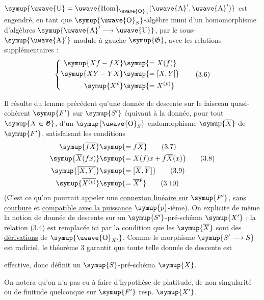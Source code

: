  $\symup{\text{\uwave{U}}=
\mathop{\text{\uwave{Hom}}}\nolimits_{\text{\uwave{O}}_S}(\text{\uwave{A}}',\text{\uwave{A}}')}$ est engendré, en
tant que $\symup{\text{\uwave{O}}_S}$-algèbre muni d'un homomorphisme d'algèbres
$\symup{\text{\uwave{A}}'\longrightarrow\text{\uwave{U}}}$, par le sous-$\symup{\text{\uwave{A}}'}$-module à
gauche $\symup{\mathfrak G}$, avec les relations supplémentaires :
\begin{equation}
  \left\{
  \begin{aligned}\symup{Xf-fX}&\symup{=X(f)}\\\symup{XY-YX}&\symup{=[X,Y]}\\\symup{X^p}&\symup{=X^{(p)}}\end{aligned}
  \right.
  \tag{3.6}
\end{equation}

Il résulte du lemme précédent qu'une donnée de descente sur le faisceau
quasi-cohérent $\symup{F'}$ sur $\symup{S'}$ équivaut à la donnée, pour tout $\symup{X\in\mathfrak G}$,
d'un $\symup{\text{\uwave{O}}_S}$-endomorphisme $\symup{\overline X}$ de $\symup{F'}$, satisfaisant les
conditions
\begin{align}
  \symup{\overline{fX}}&\symup{=f\overline X} \tag{3.7}\\
  \symup{\overline X(fx)}&\symup{=X(f)x+f\overline X(x)} \tag{3.8}\\
  \symup{\overline{[X,Y]}}&\symup{=[\overline X,\overline Y]} \tag{3.9}\\
  \symup{\overline{X^{(p)}}}&\symup{=\overline X^p} \tag{3.10}
\end{align}
(C'est ce qu'on pourrait appeler une \uline{connexion linéaire sur} $\symup{F'}$, \uline{sans courbure} et \uline{compatible avec la puissance} $\symup{p}$-ième). On explicite de même la
notion de donnée de descente sur un $\symup{S'}$-pré-schéma $\symup{X'}$ ; la relation (3.4) est
remplacée ici par la condition que les $\symup{\overline X}$ sont des \uline{dérivations} de
$\symup{\text{\uwave{O}}_{X'}}$. Comme le morphisme $\symup{S'\longrightarrow S}$ est radiciel, le
théorème 3 garantit que toute telle donnée de descente est

effective, donc définit un $\symup{S}$-pré-schéma $\symup{X}$.

On notera qu'on n'a pas eu à faire d'hypothèse de platitude, de non singularité
ou de finitude quelconque sur $\symup{F'}$ resp. $\symup{X'}$.


